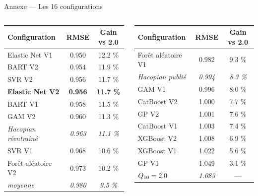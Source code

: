 \documentclass[aspectratio=169,10pt]{beamer}
\newcommand{\Qdix}{Q\textsubscript{10}}
\begin{document}
\begin{frame}{Annexe --- Les 16 configurations}
  \small
  \begin{columns}[t]
      \begin{tabular}{lcc}
        \toprule
        Configuration & RMSE & Gain vs 2.0 \\
        \midrule
        Elastic Net V1 & 0.950 & 12.2 \% \\
        BART V2 & 0.954 & 11.9 \% \\
        SVR V2 & 0.956 & 11.7 \% \\
        \textbf{Elastic Net V2} & \textbf{0.956} & \textbf{11.7 \%} \\
        BART V1 & 0.958 & 11.5 \% \\
        GAM V2 & 0.960 & 11.3 \% \\
        \textit{Hacopian réentraîné} & \textit{0.963} & \textit{11.1 \%} \\
        SVR V1 & 0.968 & 10.6 \% \\
        Forêt aléatoire V2 & 0.973 & 10.2 \% \\
        \textit{moyenne} & \textit{0.980} & \textit{9.5 \%} \\
        \bottomrule
      \end{tabular}
      \begin{tabular}{lcc}
        \toprule
        Configuration & RMSE & Gain vs 2.0 \\
        \midrule
        Forêt aléatoire V1 & 0.982 & 9.3 \% \\
        \textit{Hacopian publié} & \textit{0.994} & \textit{8.3 \%} \\
        GAM V1 & 0.996 & 8.0 \% \\
        CatBoost V2 & 1.000 & 7.7 \% \\
        GP V2 & 1.001 & 7.6 \% \\
        CatBoost V1 & 1.003 & 7.4 \% \\
        XGBoost V2 & 1.008 & 6.9 \% \\
        XGBoost V1 & 1.022 & 5.6 \% \\
        GP V1 & 1.049 & 3.1 \% \\
        \textit{$\Qdix=2.0$} & \textit{1.083} & --- \\
        \bottomrule
      \end{tabular}
  \end{columns}
\end{frame}
\end{document}
